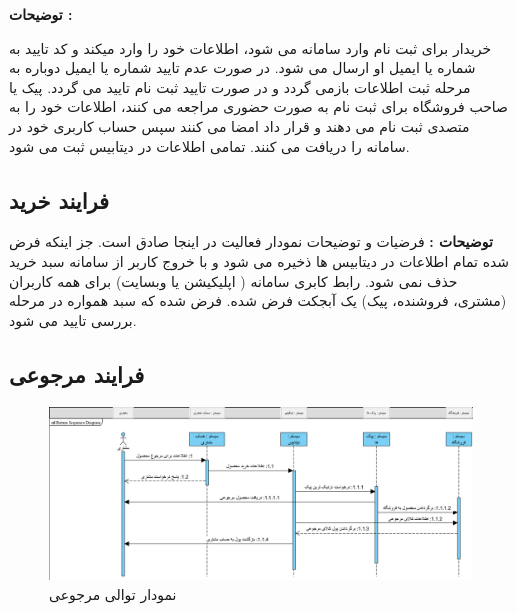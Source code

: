 \documentclass[12pt,a4paper]{article}
\begin{document}
		\textbf{توضیحات :} 
		
		
	خریدار برای ثبت نام وارد سامانه می شود، اطلاعات خود را وارد میکند و کد تایید به شماره یا ایمیل او ارسال می شود. در صورت عدم تایید شماره یا ایمیل دوباره به مرحله ثبت اطلاعات بازمی گردد و در صورت تایید ثبت نام تایید می گردد.	پیک یا صاحب فروشگاه برای ثبت نام به صورت حضوری مراجعه می کنند، اطلاعات خود را به متصدی ثبت نام می دهند و قرار داد امضا می کنند سپس حساب کاربری خود در سامانه را دریافت می کنند. تمامی اطلاعات در دیتابیس ثبت می شود.	
		\pagebreak
	
	\subsection{فرایند خرید} \label{section.sequence.buy}
	\textbf{توضیحات :}
	فرضیات و توضیحات نمودار فعالیت در اینجا صادق است. جز اینکه فرض شده تمام اطلاعات در دیتابیس ها ذخیره می شود و با خروج کاربر از سامانه سبد خرید حذف نمی شود.
	رابط کابری سامانه (  اپلیکیشن یا وبسایت) برای همه کاربران (مشتری، فروشنده، پیک) یک آبجکت فرض شده.
	فرض شده که سبد همواره در مرحله بررسی تایید می شود.
	
	
	\subsection{فرایند مرجوعی} \label{section.sequence.return}
		\begin{figure}[h!]
			\begin{center}
				\includegraphics[width=14cm]{images/Return Sequence Diagram.png}
			\end{center}
			\caption{نمودار توالی مرجوعی}
		\end{figure}
		
		\pagebreak
	

\pagebreak
\end{document}
